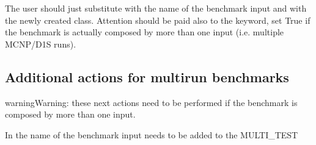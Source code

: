 \documentclass[letterpaper,10pt,english]{sphinxmanual}
\begin{document}
\begin{sphinxVerbatim}[commandchars=\\\{\}]

   
       
             
       
         

\end{sphinxVerbatim}

The user should just substitute  with the name of the benchmark input and  with
the newly created class. Attention should be paid also to the  keyword, set True if
the benchmark is actually composed by more than one input (i.e. multiple MCNP/D1S runs).


\subsection{Additional actions for multi\sphinxhyphen{}run benchmarks}
\label{\detokenize{dev/insertbenchmarks:additional-actions-for-multi-run-benchmarks}}
\begin{sphinxadmonition}{warning}{Warning:}
these next actions need to be performed  if the benchmark is composed by more than one input.
\end{sphinxadmonition}

In  the name of the benchmark input needs to be added to the MULTI\_TEST

\begin{sphinxVerbatim}[commandchars=\\\{\}]
  \PYG{p}{[}   \PYG{p}{]}
\end{sphinxVerbatim}
\end{document}
